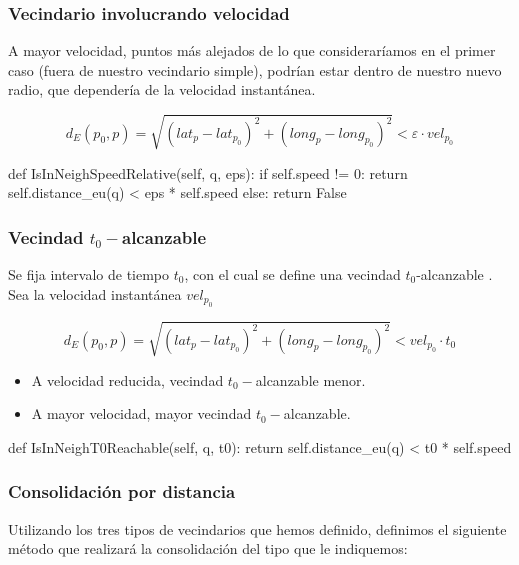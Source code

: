 \documentclass[10pt, spanish]{beamer}
\begin{document}
\begin{frame}[fragile]
\frametitle{Vecindario involucrando velocidad}

A mayor velocidad, puntos m\'as alejados de lo que considerar\'iamos en el primer caso (fuera de nuestro vecindario simple), podr\'ian estar dentro de nuestro nuevo radio, que depender\'ia de la velocidad instant\'anea.

$$ d_E(p_0, p) = \sqrt{(lat_{p} - lat_{p_0})^2 + (long_{p} - long_{p_0})^2 } < \varepsilon \cdot vel_{p_0} $$

\bigskip
\begin{python}
    def IsInNeighSpeedRelative(self, q, eps):
        if self.speed != 0:
            return self.distance_eu(q) < eps * self.speed	
        else:
            return False
\end{python}

\end{frame}
\begin{frame}[fragile]
\frametitle{Vecindad $t_0-$alcanzable}

Se fija intervalo de tiempo $t_0$, con el cual se define una vecindad $t_0$-alcanzable .\\
\bigskip
Sea la velocidad instant\'anea $vel_{p_0}$

$$ d_E(p_0, p) = \sqrt{(lat_{p} - lat_{p_0})^2 + (long_{p} - long_{p_0})^2 } < vel_{p_0} \cdot t_0 $$

\begin{itemize}
 \item A velocidad reducida, vecindad $t_0-$alcanzable menor.
 \item A mayor velocidad, mayor vecindad $t_0-$alcanzable.
\end{itemize}

\bigskip
\begin{python}
    def IsInNeighT0Reachable(self, q, t0):
        return self.distance_eu(q) < t0 * self.speed
\end{python}

\end{frame}



\begin{frame}[fragile]
\frametitle{Consolidaci\'on por distancia}
Utilizando los tres tipos de vecindarios que hemos definido, definimos el
siguiente m\'etodo que realizará la consolidaci\'on del tipo que le indiquemos:\\

\bigskip

\begin{algorithmic}[1]
        \Else
        \EndIf
\EndFor
\EndFunction
\end{algorithmic}
\end{frame}
\end{document}
